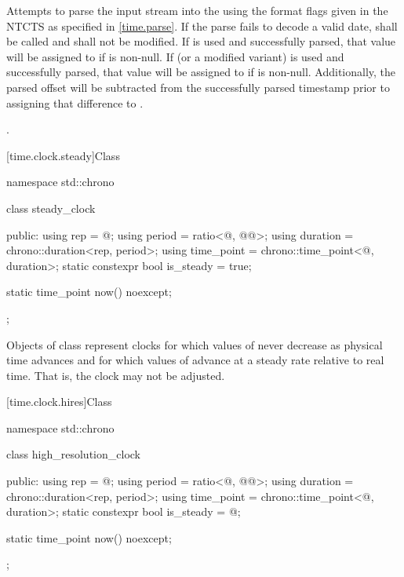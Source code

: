 \begin{itemdescr}
\pnum
\effects
Attempts to parse the input stream 
into the   using
the format flags given in the NTCTS 
as specified in \ref{time.parse}.
If the parse fails to decode a valid date,
 shall be called
and  shall not be modified.
If  is used and successfully parsed,
that value will be assigned to  if  is non-null.
If  (or a modified variant) is used and successfully parsed,
that value will be assigned to  if  is non-null.
Additionally, the parsed offset will be subtracted from
the successfully parsed timestamp prior to assigning that difference to .

\pnum
\returns {}.
\end{itemdescr}

[time.clock.steady]{Class }
%

\begin{codeblock}
namespace std::chrono {
  class steady_clock {
  public:
    using rep        = @\unspec@;
    using period     = ratio<@\unspecnc@, @\unspec{}@>;
    using duration   = chrono::duration<rep, period>;
    using time_point = chrono::time_point<@\unspecnc@, duration>;
    static constexpr bool is_steady = true;

    static time_point now() noexcept;
  };
}
\end{codeblock}

\pnum
Objects of class  represent clocks for which values of 
never decrease as physical time advances and for which values of  advance at
a steady rate relative to real time. That is, the clock may not be adjusted.

[time.clock.hires]{Class }
%

\begin{codeblock}
namespace std::chrono {
  class high_resolution_clock {
  public:
    using rep        = @\unspec@;
    using period     = ratio<@\unspecnc@, @\unspec{}@>;
    using duration   = chrono::duration<rep, period>;
    using time_point = chrono::time_point<@\unspecnc@, duration>;
    static constexpr bool is_steady = @\unspec@;

    static time_point now() noexcept;
  };
}
\end{codeblock}

